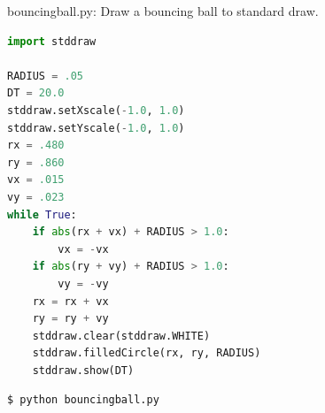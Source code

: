 \documentclass[8pt,a4paper,compress]{beamer}
\begin{document}
\begin{frame}[fragile]
\pause

\begin{framed}
\tiny bouncingball.py: Draw a bouncing ball to standard draw.
\end{framed}

\begin{lstlisting}[language=Python]
import stddraw

RADIUS = .05
DT = 20.0
stddraw.setXscale(-1.0, 1.0)
stddraw.setYscale(-1.0, 1.0)
rx = .480
ry = .860
vx = .015
vy = .023
while True:
    if abs(rx + vx) + RADIUS > 1.0:
        vx = -vx
    if abs(ry + vy) + RADIUS > 1.0:
        vy = -vy
    rx = rx + vx
    ry = ry + vy
    stddraw.clear(stddraw.WHITE)
    stddraw.filledCircle(rx, ry, RADIUS)
    stddraw.show(DT)
\end{lstlisting}

\pause

\begin{minipage}{150pt}
\begin{lstlisting}[language={}]
$ python bouncingball.py
\end{lstlisting}
\end{minipage}%
\begin{minipage}{150pt}
\hfill {}
\end{minipage}
\end{frame}
\end{document}
